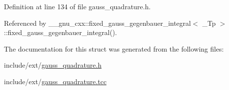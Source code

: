 Definition at line 134 of file gauss\+\_\+quadrature.\+h.



Referenced by \+\_\+\+\_\+gnu\+\_\+cxx\+::fixed\+\_\+gauss\+\_\+gegenbauer\+\_\+integral$<$ \+\_\+\+Tp $>$\+::fixed\+\_\+gauss\+\_\+gegenbauer\+\_\+integral().



The documentation for this struct was generated from the following files\+:\begin{DoxyCompactItemize}
\item 
include/ext/\hyperlink{gauss__quadrature_8h}{gauss\+\_\+quadrature.\+h}\item 
include/ext/\hyperlink{gauss__quadrature_8tcc}{gauss\+\_\+quadrature.\+tcc}\end{DoxyCompactItemize}
